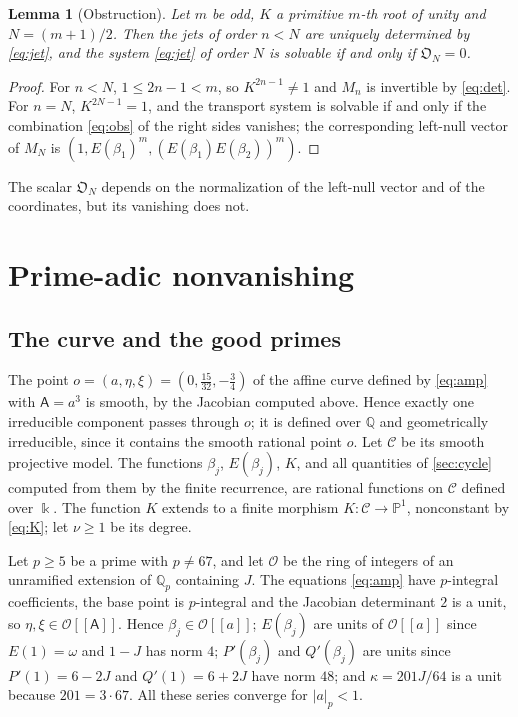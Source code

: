 \documentclass[11pt]{amsart}
\numberwithin{equation}{section}
\newtheorem{lemma}[theorem]{Lemma}
\theoremstyle{definition}
\theoremstyle{remark}
\newcommand{\Q}{\mathbb{Q}}
\newcommand{\abs}[1]{\lvert #1\rvert}
\newcommand{\Obs}{\mathfrak{O}}
\newcommand{\kk}{\Bbbk}
\newcommand{\sA}{\mathsf A}
\begin{document}
\begin{lemma}[Obstruction]\label{lem:obs}
Let $m$ be odd, $K$ a primitive $m$-th root of unity and $N=(m+1)/2$. Then the jets of order $n<N$ are uniquely determined by \eqref{eq:jet}, and the system \eqref{eq:jet} of order $N$ is solvable if and only if $\Obs_N=0$.
\end{lemma}

\begin{proof}
For $n<N$, $1\le2n-1<m$, so $K^{2n-1}\ne1$ and $M_n$ is invertible by \eqref{eq:det}. For $n=N$, $K^{2N-1}=1$, and the transport system is solvable if and only if the combination \eqref{eq:obs} of the right sides vanishes; the corresponding left-null vector of $M_N$ is $(1,E(\beta_1)^m,(E(\beta_1)E(\beta_2))^m)$.
\end{proof}

The scalar $\Obs_N$ depends on the normalization of the left-null vector and of the coordinates, but its vanishing does not.

\section{Prime-adic nonvanishing}\label{sec:padic}

\subsection{The curve and the good primes}\label{sec:curve}
The point $o=(a,\eta,\xi)=(0,\frac{15}{32},-\frac34)$ of the affine curve defined by \eqref{eq:amp} with $\sA=a^3$ is smooth, by the Jacobian computed above. Hence exactly one irreducible component passes through $o$; it is defined over $\Q$ and geometrically irreducible, since it contains the smooth rational point $o$. Let $\mathcal C$ be its smooth projective model. The functions $\beta_j$, $E(\beta_j)$, $K$, and all quantities of \cref{sec:cycle} computed from them by the finite recurrence, are rational functions on $\mathcal C$ defined over $\kk$. The function $K$ extends to a finite morphism $K\colon\mathcal C\to\mathbb P^1$, nonconstant by \eqref{eq:K}; let $\nu\ge1$ be its degree.

Let $p\ge5$ be a prime with $p\ne67$, and let $\mathcal O$ be the ring of integers of an unramified extension of $\Q_p$ containing $J$. The equations \eqref{eq:amp} have $p$-integral coefficients, the base point is $p$-integral and the Jacobian determinant $2$ is a unit, so $\eta,\xi\in\mathcal O[[\sA]]$. Hence $\beta_j\in\mathcal O[[a]]$; $E(\beta_j)$ are units of $\mathcal O[[a]]$ since $E(1)=\omega$ and $1-J$ has norm $4$; $P'(\beta_j)$ and $Q'(\beta_j)$ are units since $P'(1)=6-2J$ and $Q'(1)=6+2J$ have norm $48$; and $\kappa=201J/64$ is a unit because $201=3\cdot67$. All these series converge for $\abs a_p<1$.
\end{document}
